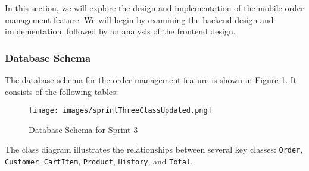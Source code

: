 In this section, we will explore the design and implementation of the mobile order management feature. We will begin by examining the backend design and implementation, followed by an analysis of the frontend design.

\subsubsection{Database Schema}

The database schema for the order management feature is shown in Figure \ref{fig:db_schema_sprint3}. It consists of the following tables:

\begin{figure}[H]
    \centering
    \texttt{[image: images/sprintThreeClassUpdated.png]}
    \caption{Database Schema for Sprint 3}
    \label{fig:db_schema_sprint3}
\end{figure}

The class diagram illustrates the relationships between several key classes: \texttt{Order}, \texttt{Customer}, \texttt{CartItem}, \texttt{Product}, \texttt{History}, and \texttt{Total}.

